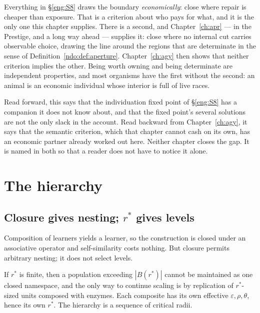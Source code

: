 \begin{remark}
\label{eng:rmk:two-criteria}
Everything in \S\ref{eng:S8} draws the boundary \emph{economically}:
close where repair is cheaper than exposure.
That is a criterion about who pays for what, and it is the only one this
chapter supplies.
There is a second, and Chapter~\ref{ch:apr} --- in the Prestige, and a
long way ahead --- supplies it: close where no internal cut carries
observable choice, drawing the line around the regions that are
determinate in the sense of Definition~\ref{ndo:def:aperture}.
Chapter~\ref{ch:agy} then shows that neither criterion implies the
other.
Being worth owning and being determinate are independent properties, and
most organisms have the first without the second: an animal is an
economic individual whose interior is full of live races.

Read forward, this says that the individuation fixed point of
\S\ref{eng:S8} has a companion it does not know about, and that the
fixed point's several solutions are not the only slack in the account.
Read backward from Chapter~\ref{ch:agy}, it says that the semantic
criterion, which that chapter cannot cash on its own, has an economic
partner already worked out here.
Neither chapter closes the gap.
It is named in both so that a reader does not have to notice it alone.
\end{remark}

\section{The hierarchy}\label{eng:S9}
\label{eng:sec:hier}

\subsection{Closure gives nesting; $r^\ast$ gives levels}\label{eng:S9.1}

Composition of learners yields a learner, so the construction is closed
under an associative operator and self-similarity costs nothing. But
closure permits arbitrary nesting; it does not select levels.

\begin{proposition}\label{eng:levels-forced-finite-r}
If $r^\ast$ is finite, then a population exceeding $|B(r^\ast)|$ cannot be
maintained as one closed namespace, and the only way to continue scaling is
by replication of $r^\ast$-sized units composed with enzymes. Each
composite has its own effective $\varepsilon, \rho, \theta$, hence its own
$r^\ast$. The hierarchy is a sequence of critical radii.
\end{proposition}

